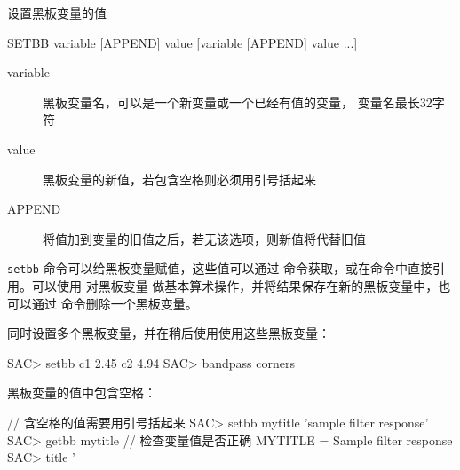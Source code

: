 \label{cmd:setbb}

设置黑板变量的值

\begin{SACSTX}
SETBB variable [APPEND] value [variable [APPEND] value ...]
\end{SACSTX}

\begin{description}
\item [variable] 黑板变量名，可以是一个新变量或一个已经有值的变量，
    变量名最长32字符
\item [value] 黑板变量的新值，若包含空格则必须用引号括起来
\item [APPEND] 将值加到变量的旧值之后，若无该选项，则新值将代替旧值
\end{description}

\texttt{setbb} 命令可以给黑板变量赋值，这些值可以通过 
命令获取，或在命令中直接引用。可以使用  对黑板变量
做基本算术操作，并将结果保存在新的黑板变量中，也可以通过 
命令删除一个黑板变量。

同时设置多个黑板变量，并在稍后使用使用这些黑板变量：
\begin{SACCode}
SAC> setbb c1 2.45 c2 4.94
SAC> bandpass corners %
\end{SACCode}

黑板变量的值中包含空格：
\begin{SACCode}
                            // 含空格的值需要用引号括起来
SAC> setbb mytitle 'sample filter response'
SAC> getbb mytitle          // 检查变量值是否正确
 MYTITLE = Sample filter response
SAC> title '%
\end{SACCode}
